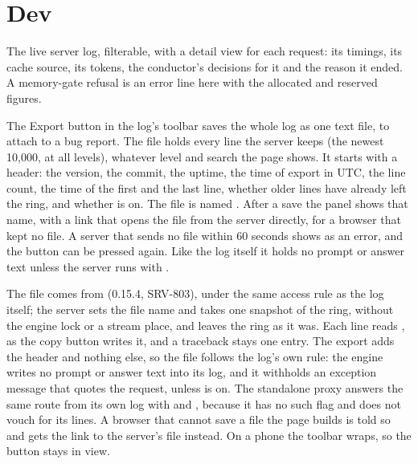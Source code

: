 
\section{Dev}\label{sec:dash-dev}

The live server log, filterable, with a detail view for each request: its timings, its cache source, its tokens, the conductor's decisions for it and the reason it ended. A memory-gate refusal is an error line here with the allocated and reserved figures.

The Export button in the log's toolbar saves the whole log as one text file, to attach to a bug report. The file holds every line the server keeps (the newest 10,000, at all levels), whatever level and search the page shows. It starts with a header: the version, the commit, the uptime, the time of export in UTC, the line count, the time of the first and the last line, whether older lines have already left the ring, and whether  is on. The file is named . After a save the panel shows that name, with a link that opens the file from the server directly, for a browser that kept no file. A server that sends no file within 60 seconds shows as an error, and the button can be pressed again. Like the log itself it holds no prompt or answer text unless the server runs with .

The file comes from  (0.15.4, SRV-803), under the same access rule as the log itself; the server sets the file name and takes one snapshot of the ring, without the engine lock or a stream place, and leaves the ring as it was. Each line reads , as the copy button writes it, and a traceback stays one entry. The export adds the header and nothing else, so the file follows the log's own rule: the engine writes no prompt or answer text into its log, and it withholds an exception message that quotes the request, unless  is on. The standalone proxy answers the same route from its own log with  and , because it has no such flag and does not vouch for its lines. A browser that cannot save a file the page builds is told so and gets the link to the server's file instead. On a phone the toolbar wraps, so the button stays in view.

